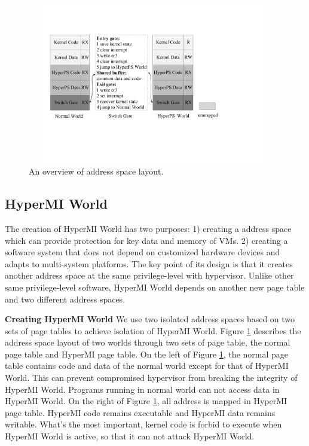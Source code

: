 \documentclass[conference]{IEEEtran}
\begin{document}
\fi





\begin{figure}
\centerline{\includegraphics[width=11cm, height=7cm]{pdfvmcs2.pdf}}%
\caption{An overview of address space layout.} \label{fig2}
\end{figure}



\subsection{HyperMI World} \label {HWorld}

The creation of HyperMI World has two purposes: 1) creating a address space which can provide protection for key data and memory of VMs. 2) creating a software system that does not depend on customized hardware devices and adapts to multi-system platforms. The key point of its design is that it creates another address space at the same privilege-level with hypervisor. Unlike other same privilege-level software, HyperMI World depends on another new page table and two different address spaces.

\textbf{Creating HyperMI World}
 We use two isolated address spaces based on two sets of page tables to achieve isolation of HyperMI World.
Figure \ref{fig2} describes the address space layout of two worlds through two sets of page table, the normal page table and HyperMI page table. On the left of Figure \ref{fig2}, the normal page table contains code and data of the normal world except for that of HyperMI World. This can prevent compromised hypervisor from breaking the integrity of HyperMI World. Programs running in normal world can not access data in HyperMI World. On the right of Figure \ref{fig2}, all address is mapped in HyperMI page table.
HyperMI code remains executable and HyperMI data remains writable. What's the most important, kernel code is forbid to execute when HyperMI World is active, so that it can not attack HyperMI World.
\end{document}
